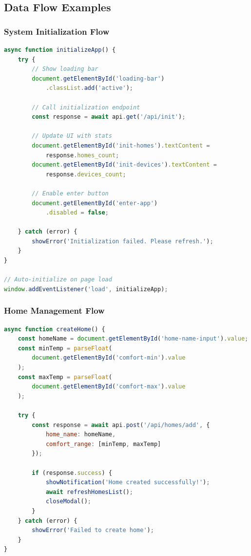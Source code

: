 \documentclass[12pt,a4paper]{article}
\begin{document}
\subsection{Data Flow Examples}

\subsubsection{System Initialization Flow}

\begin{lstlisting}[language=JavaScript, caption=Welcome screen initialization]
async function initializeApp() {
    try {
        // Show loading bar
        document.getElementById('loading-bar')
            .classList.add('active');
        
        // Call initialization endpoint
        const response = await api.get('/api/init');
        
        // Update UI with stats
        document.getElementById('init-homes').textContent = 
            response.homes_count;
        document.getElementById('init-devices').textContent = 
            response.devices_count;
        
        // Enable enter button
        document.getElementById('enter-app')
            .disabled = false;
            
    } catch (error) {
        showError('Initialization failed. Please refresh.');
    }
}

// Auto-initialize on page load
window.addEventListener('load', initializeApp);
\end{lstlisting}

\subsubsection{Home Management Flow}

\begin{lstlisting}[language=JavaScript, caption=Creating a new home]
async function createHome() {
    const homeName = document.getElementById('home-name-input').value;
    const minTemp = parseFloat(
        document.getElementById('comfort-min').value
    );
    const maxTemp = parseFloat(
        document.getElementById('comfort-max').value
    );
    
    try {
        const response = await api.post('/api/homes/add', {
            home_name: homeName,
            comfort_range: [minTemp, maxTemp]
        });
        
        if (response.success) {
            showNotification('Home created successfully!');
            await refreshHomesList();
            closeModal();
        }
    } catch (error) {
        showError('Failed to create home');
    }
}
\end{lstlisting}
\end{document}
